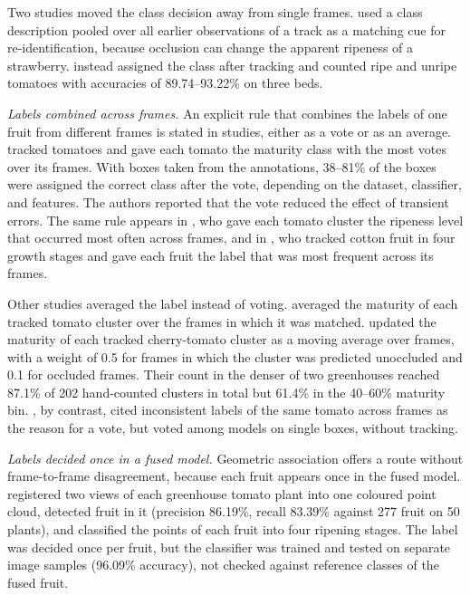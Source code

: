 Two studies moved the class decision away from single frames. \citet{kirk2021robust} used a class description pooled over all earlier observations of a track as a matching cue for re-identification, because occlusion can change the apparent ripeness of a strawberry. \citet{zheng2025robust} instead assigned the class after tracking and counted ripe and unripe tomatoes with accuracies of 89.74--93.22\% on three beds.

\textit{Labels combined across frames.} An explicit rule that combines the labels of one fruit from different frames is stated in \nClassVote studies, either as a vote or as an average. \citet{lin2026tomato} tracked tomatoes and gave each tomato the maturity class with the most votes over its frames. With boxes taken from the annotations, 38--81\% of the boxes were assigned the correct class after the vote, depending on the dataset, classifier, and features. The authors reported that the vote reduced the effect of transient errors. The same rule appears in \citet{qi2024improved}, who gave each tomato cluster the ripeness level that occurred most often across frames, and in \citet{bolouri2024cottonsense}, who tracked cotton fruit in four growth stages and gave each fruit the label that was most frequent across its frames.

Other studies averaged the label instead of voting. \citet{tenorio2021automatic} averaged the maturity of each tracked tomato cluster over the frames in which it was matched. \citet{rong2025end} updated the maturity of each tracked cherry-tomato cluster as a moving average over frames, with a weight of 0.5 for frames in which the cluster was predicted unoccluded and 0.1 for occluded frames. Their count in the denser of two greenhouses reached 87.1\% of 202 hand-counted clusters in total but 61.4\% in the 40--60\% maturity bin. \citet{pai2024maturity}, by contrast, cited inconsistent labels of the same tomato across frames as the reason for a vote, but voted among models on single boxes, without tracking.

\textit{Labels decided once in a fused model.} Geometric association offers a route without frame-to-frame disagreement, because each fruit appears once in the fused model. \citet{zhang2022measurement} registered two views of each greenhouse tomato plant into one coloured point cloud, detected fruit in it (precision 86.19\%, recall 83.39\% against 277 fruit on 50 plants), and classified the points of each fruit into four ripening stages. The label was decided once per fruit, but the classifier was trained and tested on separate image samples (96.09\% accuracy), not checked against reference classes of the fused fruit.

